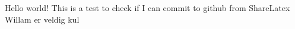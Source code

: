 \documentclass{article}
\begin{document}
  Hello world!
  This is a test to check if I can commit to github from ShareLatex
  Willam er veldig kul
  
\end{document}
